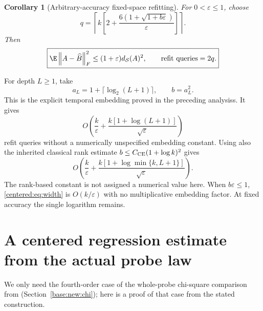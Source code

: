 \documentclass[11pt,oneside,openany,a4paper]{book}
\numberwithin{equation}{chapter}
\newtheorem{corollary}[theorem]{Corollary}
\theoremstyle{definition}
\theoremstyle{remark}
\newcommand{\F}[1]{\left\lVert#1\right\rVert_F}
\begin{document}
\begin{corollary}[Arbitrary-accuracy fixed-space refitting]\label{centered:cor:eps}
For $0<\varepsilon\le1$, choose
\begin{equation}\label{centered:eq:width}
 \boxed{q=\left\lceil k\left[2+\frac{6(1+\sqrt{1+b\varepsilon})}{\varepsilon}\right]\right\rceil.}
\end{equation}
Then
\begin{equation}\label{centered:eq:eps}
 \boxed{\E\F{A-\widehat B}^2\le(1+\varepsilon)d_{\mathcal S}(A)^2,\qquad
 \text{refit queries}=2q.}
\end{equation}
\end{corollary}

For depth $L\ge1$, take
\[
 a_L=1+\lceil\log_2(L+1)\rceil,\qquad b=a_L^2.
\]
This is the explicit temporal embedding proved in the preceding analysiss. It gives
\[
 O\!\left(\frac{k}{\varepsilon}+\frac{k[1+\log(L+1)]}{\sqrt\varepsilon}\right)
\]
refit queries without a numerically unspecified embedding constant. Using also the inherited classical rank estimate $b\le C_{\rm CE}(1+\log k)^2$ \cite[Theorem 1.1, squared-energy form]{NTV} gives
\begin{equation}\label{centered:eq:asymptotic}
 O\!\left(\frac{k}{\varepsilon}+
 \frac{k[1+\log\min\{k,L+1\}]}{\sqrt\varepsilon}\right).
\end{equation}
The rank-based constant is not assigned a numerical value here. When $b\varepsilon\le1$, \eqref{centered:eq:width} is $O(k/\varepsilon)$ with no multiplicative embedding factor. At fixed accuracy the single logarithm remains.

\section{A centered regression estimate from the actual probe law}\label{centered:sec:regression}
We only need the fourth-order case of the whole-probe chi-square comparison from (Section~\ref{base:new:chi}); here is a proof of that case from the stated construction.
\end{document}
